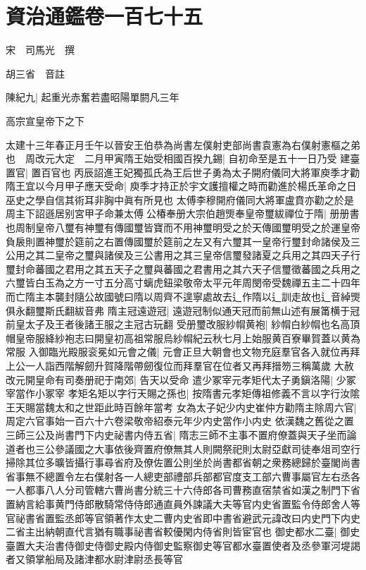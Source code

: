 \section{資治通鑑卷一百七十五}
宋　司馬光　撰

胡三省　音註

陳紀九|{
	起重光赤奮若盡昭陽單閼凡三年}


高宗宣皇帝下之下

太建十三年春正月壬午以晉安王伯恭為尚書左僕射吏部尚書袁憲為右僕射憲樞之弟也　周改元大定　二月甲寅隋王始受相國百揆九錫|{
	自初命至是五十一日乃受}
建臺置官|{
	置百官也}
丙辰詔進王妃獨孤氏為王后世子勇為太子開府儀同大將軍庾季才勸隋王宜以今月甲子應天受命|{
	庾季才持正於宇文護擅權之時而勸進於楊氏革命之日巫史之學自信其術耳非胸中眞有所見也}
太傅李穆開府儀同大將軍盧賁亦勸之於是周主下詔遜居别宮甲子命兼太傅公椿奉册大宗伯趙煚奉皇帝璽紱禪位于隋|{
	册册書也周制皇帝八璽有神璽有傳國璽皆寶而不用神璽明受之於天傳國璽明受之於運皇帝負扆則置神璽於筵前之右置傳國璽於筵前之左又有六璽其一皇帝行璽封命諸侯及三公用之其二皇帝之璽與諸侯及三公書用之其三皇帝信璽發諸夏之兵用之其四天子行璽封命蕃國之君用之其五天子之璽與蕃國之君書用之其六天子信璽徵蕃國之兵用之六璽皆白玉為之方一寸五分高寸螭虎鈕梁敬帝太平元年周閔帝受魏禪五主二十四年而亡隋主本襲封隨公故國號曰隋以周齊不遑寧處故去辶作隋以辶訓走故也辶音綽煚俱永翻璽斯氏翻紱音弗}
隋主冠遠遊冠|{
	遠遊冠制似通天冠而前無山述有展筩横于冠前皇太子及王者後諸王服之主冠古玩翻}
受册璽改服紗㡌黄袍|{
	紗㡌白紗㡌也名高頂帽皇帝服絳紗袍志曰開皇初高祖常服烏紗㡌紀云秋七月上始服黄百寮畢賀蓋以黄為常服}
入御臨光殿服衮冕如元會之儀|{
	元會正旦大朝會也文物充庭羣官各入就位再拜上公一人詣西階解劒升賀降階帶劒復位而拜羣官在位者又再拜搢笏三稱萬歲}
大赦改元開皇命有司奏册祀于南郊|{
	告天以受命}
遣少冢宰元孝矩代太子勇鎭洛陽|{
	少冢宰當作小冢宰}
孝矩名矩以字行天賜之孫也|{
	按隋書元孝矩傳祖修義不言以字行汝隂王天賜當魏太和之世距此時百餘年當考}
女為太子妃少内史崔仲方勸隋主除周六官|{
	周定六官事始一百六十六卷梁敬帝紹泰元年少内史當作小内史}
依漢魏之舊從之置三師三公及尚書門下内史祕書内侍五省|{
	隋志三師不主事不置府僚蓋與天子坐而論道者也三公參議國之大事依後齊置府僚無其人則闕祭祀則太尉亞獻司徒奉俎司空行掃除其位多曠皆攝行事尋省府及僚佐置公則坐於尚書都省朝之衆務總歸於臺閣尚書省事無不總置令左右僕射各一人總吏部禮部兵部都官度支工部六曹事屬官左右丞各一人都事八人分司管轄六曹尚書分統三十六侍郎各司曹務直宿禁省如漢之制門下省置納言給事黄門侍郎散騎常侍侍郎通直員外諫議大夫等官内史省置監令侍郎舍人等官祕書省置監丞郎等官領著作太史二曹内史省即中書省避武元諱改曰内史門下内史二省主出納朝直代言猶有職事祕書省較優閑内侍省則皆宦官也}
御史都水二臺|{
	御史臺置大夫治書侍御史侍御史殿内侍御史監察御史等官都水臺置使者及丞參軍河堤謁者又領掌船局及諸津都水尉津尉丞長等官}
